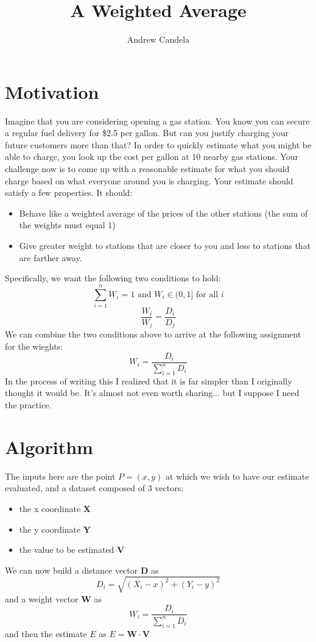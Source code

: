 \documentclass[11pt, oneside]{article}   	%
\title{A Weighted Average}
\author{Andrew Candela}
\begin{document}
\maketitle
\section*{Motivation}Imagine that you are considering opening a gas station. You know you can secure a regular fuel delivery for \$2.5 per gallon. But can you justify charging your future customers more than that? In order to quickly estimate what you might be able to charge, you look up the cost per gallon at 10 nearby gas stations. Your challenge now is to come up with a reasonable estimate for what you should charge based on what everyone around you is charging.
Your estimate should satisfy a few properties. It should:
\begin{itemize}
\item{Behave like a weighted average of the prices of the other stations (the sum of the weights must equal 1)}
\item{Give greater weight to stations that are closer to you and less to stations that are farther away.}
\end{itemize}
Specifically, we want the following two conditions to hold:
\begin{equation}
\sum_{i=1}^n W_i = 1 \text{ and } W_i \in (0,1] \text{ for all } i
\end{equation}
\begin{equation}
\frac{W_i}{W_j}=\frac{D_i}{D_j}
\end{equation}
We can combine the two conditions above to arrive at the following assignment for the wieghts:\[W_i=\frac{D_i}{\sum_{i=1}^{n}D_i}\]
In the process of writing this I realized that it is far simpler than I originally thought it would be. It's almost not even worth sharing... but I suppose I need the practice.


\section*{Algorithm}
The inputs here are the point $P=(x,y)$ at which we wish to have our estimate evaluated, and a dataset composed of 3 vectors: 
\begin{itemize}
\item{the x coordinate $\bm{X}$} 
\item{the y coordinate $\bm{Y}$} 
\item{the value to be estimated $\bm{V}$}
\end{itemize}
We can now build a distance vector $\bm{D}$ as 
\[
D_i=\sqrt{(X_i - x)^2+(Y_i - y)^2}
\]
and a weight vector $\bm{W}$ as 
\[W_i = \frac{D_i}{\sum_{i=1}^{n}D_i}\]
and then the estimate $E$ as $E = \bm{W} \cdot \bm{V}$
\end{document}
